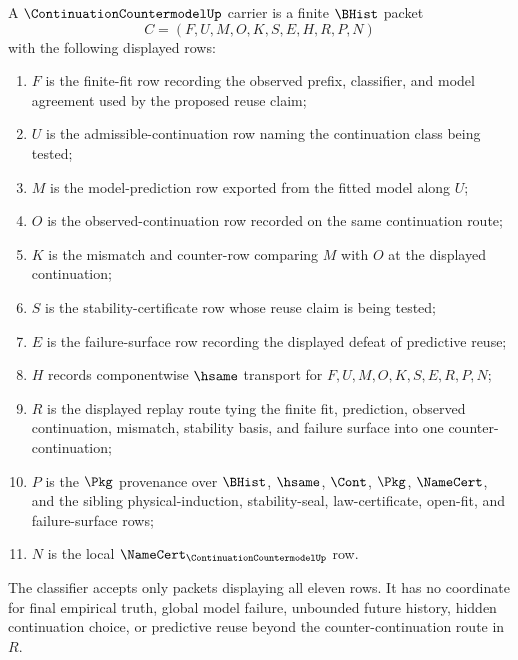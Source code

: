 \begin{definition}
\label{def:continuationcountermodel-carrier}
A $\ContinuationCountermodelUp$ carrier is a finite $\BHist$ packet
$$
C=(F,U,M,O,K,S,E,H,R,P,N)
$$
with the following displayed rows:
\begin{enumerate}
\item $F$ is the finite-fit row recording the observed prefix, classifier, and model agreement used by the proposed reuse claim;
\item $U$ is the admissible-continuation row naming the continuation class being tested;
\item $M$ is the model-prediction row exported from the fitted model along $U$;
\item $O$ is the observed-continuation row recorded on the same continuation route;
\item $K$ is the mismatch and counter-row comparing $M$ with $O$ at the displayed continuation;
\item $S$ is the stability-certificate row whose reuse claim is being tested;
\item $E$ is the failure-surface row recording the displayed defeat of predictive reuse;
\item $H$ records componentwise $\hsame$ transport for $F,U,M,O,K,S,E,R,P,N$;
\item $R$ is the displayed replay route tying the finite fit, prediction, observed continuation, mismatch, stability basis, and failure surface into one counter-continuation;
\item $P$ is the $\Pkg$ provenance over $\BHist$, $\hsame$, $\Cont$, $\Pkg$, $\NameCert$, and the sibling physical-induction, stability-seal, law-certificate, open-fit, and failure-surface rows;
\item $N$ is the local $\NameCert_{\ContinuationCountermodelUp}$ row.
\end{enumerate}
The classifier accepts only packets displaying all eleven rows. It has no coordinate for final empirical truth, global model failure, unbounded future history, hidden continuation choice, or predictive reuse beyond the counter-continuation route in $R$.
\end{definition}

